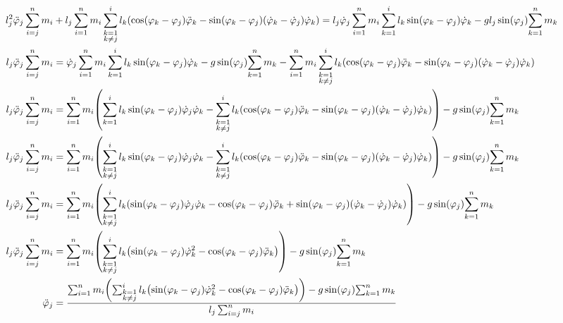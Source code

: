 \documentclass{article}
\renewcommand{\phi}{\varphi}
\begin{document}
\begin{align*}
  l_j^2 \ddot\phi_j \sum_{i=j}^n m_i &+ l_j \sum_{i=1}^n m_i \sum_{\substack{k=1\\k \neq j}}^i l_k \pqty{\cos(\phi_k - \phi_j) \ddot\phi_k - \sin(\phi_k - \phi_j)(\dot\phi_k - \dot\phi_j)\dot\phi_k} = l_j \dot\phi_j \sum_{i=1}^n m_i \sum_{k=1}^i l_k \sin(\phi_k - \phi_j) \dot\phi_k - g l_j \sin(\phi_j) {\sum_{k=1}^n m_k}\\
  l_j \ddot\phi_j \sum_{i=j}^n m_i &= \dot\phi_j \sum_{i=1}^n m_i \sum_{k=1}^i l_k \sin(\phi_k - \phi_j) \dot\phi_k - g \sin(\phi_j) {\sum_{k=1}^n m_k} - \sum_{i=1}^n m_i \sum_{\substack{k=1\\k \neq j}}^i l_k \pqty{\cos(\phi_k - \phi_j) \ddot\phi_k - \sin(\phi_k - \phi_j)(\dot\phi_k - \dot\phi_j)\dot\phi_k} \\
  l_j \ddot\phi_j \sum_{i=j}^n m_i &= \sum_{i=1}^n m_i \pqty{\sum_{k=1}^i l_k \sin(\phi_k - \phi_j) \dot\phi_j \dot\phi_k - \sum_{\substack{k=1\\k \neq j}}^i l_k \pqty{\cos(\phi_k - \phi_j) \ddot\phi_k - \sin(\phi_k - \phi_j)(\dot\phi_k - \dot\phi_j)\dot\phi_k}} - g \sin(\phi_j) {\sum_{k=1}^n m_k} \\
  l_j \ddot\phi_j \sum_{i=j}^n m_i &= \sum_{i=1}^n m_i \pqty{\sum_{\substack{k=1\\k \neq j}}^i l_k \sin(\phi_k - \phi_j) \dot\phi_j \dot\phi_k - \sum_{\substack{k=1\\k \neq j}}^i l_k \pqty{\cos(\phi_k - \phi_j) \ddot\phi_k - \sin(\phi_k - \phi_j)(\dot\phi_k - \dot\phi_j)\dot\phi_k}} - g \sin(\phi_j) {\sum_{k=1}^n m_k} \\
  l_j \ddot\phi_j \sum_{i=j}^n m_i &= \sum_{i=1}^n m_i \pqty{\sum_{\substack{k=1\\k \neq j}}^i l_k \pqty{\sin(\phi_k - \phi_j) \dot\phi_j \dot\phi_k - \cos(\phi_k - \phi_j) \ddot\phi_k + \sin(\phi_k - \phi_j)(\dot\phi_k - \dot\phi_j)\dot\phi_k}} - g \sin(\phi_j) {\sum_{k=1}^n m_k}\\
  l_j \ddot\phi_j \sum_{i=j}^n m_i &= \sum_{i=1}^n m_i \pqty{\sum_{\substack{k=1\\k \neq j}}^i l_k \pqty{\sin(\phi_k - \phi_j) \dot\phi_k^2 - \cos(\phi_k - \phi_j) \ddot\phi_k}} - g \sin(\phi_j) {\sum_{k=1}^n m_k}\\
  \ddot\phi_j &= \frac{\sum_{i=1}^n m_i \pqty{\sum_{\substack{k=1\\k \neq j}}^i l_k \pqty{\sin(\phi_k - \phi_j) \dot\phi_k^2 - \cos(\phi_k - \phi_j) \ddot\phi_k}} - g \sin(\phi_j){\sum_{k=1}^n m_k}}{l_j \sum_{i=j}^n m_i} \\
\end{align*}
\end{document}
